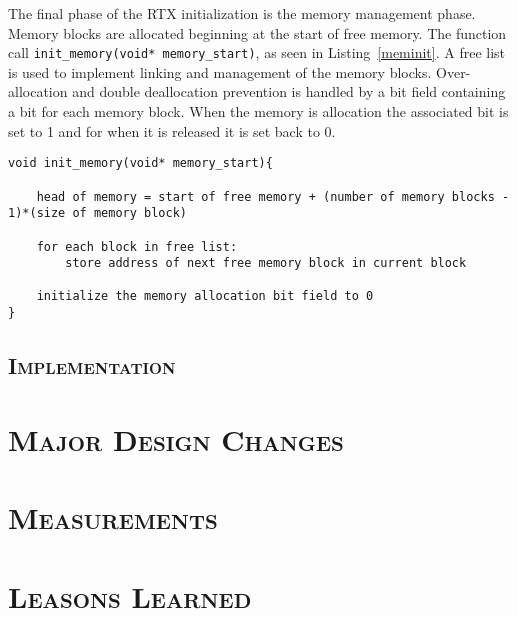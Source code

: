 \documentclass[oneside]{report}
\begin{document}
The final phase of the RTX initialization is the memory management phase.
Memory blocks are allocated beginning at the start of free memory. The function
call \texttt{init\_memory(void* memory\_start)}, as seen in
Listing~\ref{meminit}. A free list is used to implement linking and management
of the memory blocks. Over-allocation and double deallocation prevention is 
handled by a bit field containing a bit for each memory block. When the memory 
is allocation the associated bit is set to 1 and for when it is released it is 
set back to 0.

\begin{lstlisting}
void init_memory(void* memory_start){
    
    head of memory = start of free memory + (number of memory blocks - 1)*(size of memory block)
    
    for each block in free list:
        store address of next free memory block in current block

    initialize the memory allocation bit field to 0
}
\end{lstlisting}


\section{\textsc{Implementation}}

\chapter{\textsc{Major Design Changes}}

\chapter{\textsc{Measurements}}

\chapter{\textsc{Leasons Learned}}
\end{document}
